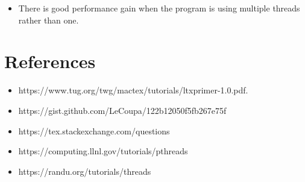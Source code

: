 \documentclass[12pt, a4paper]{article}
\begin{document}
	\newpage

	\begin{itemize}

		\item There is good performance gain when the program is using multiple threads rather than one.


	\end{itemize}



	\section{References}

	\begin{itemize}
	  \item https://www.tug.org/twg/mactex/tutorials/ltxprimer-1.0.pdf.
	  \item https://gist.github.com/LeCoupa/122b12050f5fb267e75f
	  \item https://tex.stackexchange.com/questions
	  \item https://computing.llnl.gov/tutorials/pthreads
	  \item https://randu.org/tutorials/threads
	\end{itemize}
\end{document}
